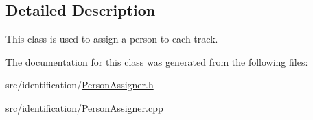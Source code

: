 \subsection{Detailed Description}
This class is used to assign a person to each track. 

The documentation for this class was generated from the following files\+:\begin{DoxyCompactItemize}
\item 
src/identification/\mbox{\hyperlink{_person_assigner_8h}{Person\+Assigner.\+h}}\item 
src/identification/Person\+Assigner.\+cpp\end{DoxyCompactItemize}
